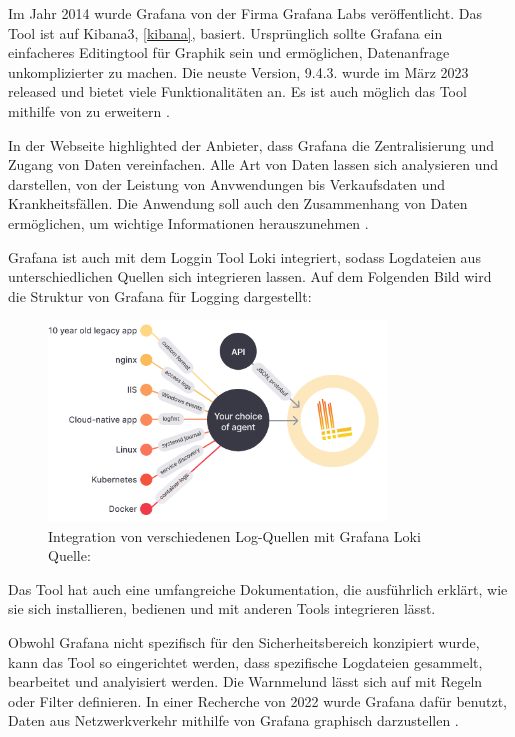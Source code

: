 Im Jahr 2014 wurde Grafana von der Firma Grafana Labs veröffentlicht. Das Tool ist auf Kibana3, \ref{kibana}, basiert. Ursprünglich sollte Grafana ein einfacheres Editingtool für Graphik sein und ermöglichen, Datenanfrage unkomplizierter zu machen. Die neuste Version, 9.4.3. wurde im März 2023 released und bietet viele Funktionalitäten an. Es ist auch möglich das Tool mithilfe von  zu erweitern \citep{Oedegaard_historyGrafana}. 

In der Webseite highlighted der Anbieter, dass Grafana die Zentralisierung und Zugang von Daten vereinfachen. Alle Art von Daten lassen sich analysieren und darstellen, von der Leistung von Anvwendungen bis Verkaufsdaten und Krankheitsfällen. Die Anwendung soll auch den Zusammenhang von Daten ermöglichen, um wichtige Informationen herauszunehmen \citep{Grafana_Grafana}.

Grafana ist auch mit dem Loggin Tool Loki integriert, sodass Logdateien aus unterschiedlichen Quellen sich integrieren lassen. Auf dem Folgenden Bild wird die Struktur von Grafana für Logging dargestellt:

\begin{figure}[H]
   \centering
   \includegraphics[width=0.8\textwidth]{assets/2_p10.png}
   \caption{Integration von verschiedenen Log-Quellen mit Grafana Loki \\Quelle: \citep{Grafana_Logs}}
   \centering
\end{figure}

Das Tool hat auch eine umfangreiche Dokumentation, die ausführlich erklärt, wie sie sich installieren, bedienen und mit anderen Tools integrieren lässt.  

\newpage
Obwohl Grafana nicht spezifisch für den Sicherheitsbereich konzipiert wurde, kann das Tool so eingerichtet werden, dass spezifische Logdateien gesammelt, bearbeitet und analyisiert werden. Die Warnmelund lässt sich auf mit Regeln oder Filter definieren. In einer Recherche von 2022 wurde Grafana dafür benutzt, Daten aus Netzwerkverkehr mithilfe von Grafana graphisch darzustellen \citep{Manases_grafananetwork}. 

